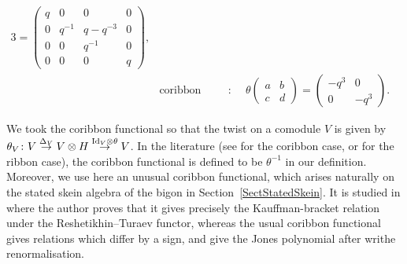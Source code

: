 \begin{Definition}
\begin{alignat*}{3}
=\begin{pmatrix} q& 0 & 0 & 0\\ 0 & q^{-1} & q-q^{-3} & 0\\ 0 & 0 & q^{-1}&0\\ 0 & 0 & 0 & q \end{pmatrix}\!,&
\\
& \text{coribbon functional}\colon \quad && \theta \begin{pmatrix} a & b \\[-.5ex] c & d \end{pmatrix}
= \begin{pmatrix} -q^3 & 0 \\[-.5ex] 0 & -q^3 \end{pmatrix}\!.&
\end{alignat*}
\end{Definition}

\begin{Remark}
We took the coribbon functional so that the twist on a comodule $V$ is given by $\theta_V\colon V \overset{\Delta_V}{\to} V \otimes H \overset{{\rm Id}_V \otimes \theta}{\to} V$. In the literature (see \cite{Wakui} for the coribbon case, or \cite{Kassel} for the ribbon case), the coribbon functional is defined to be $\theta^{-1}$ in our definition.
Moreover, we use here an unusual coribbon functional, which arises naturally on the stated skein algebra of the bigon in Section~\ref{SectStatedSkein}. It is studied in \cite{Tingley} where the author proves that it gives precisely the Kauffman-bracket relation under the Reshetikhin--Turaev functor, whereas the usual coribbon functional gives relations which differ by a sign, and give the Jones polynomial after writhe renormalisation.
\end{Remark}

